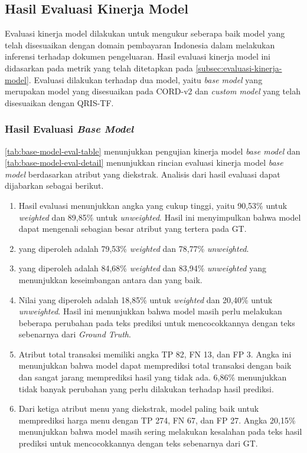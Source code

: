 \subsection{Hasil Evaluasi Kinerja Model}
\label{subsec:hasil-evaluasi-kinerja-model}

Evaluasi kinerja model dilakukan untuk mengukur seberapa baik model \donut{} yang telah disesuaikan dengan domain pembayaran Indonesia dalam melakukan inferensi terhadap dokumen pengeluaran. 
Hasil evaluasi kinerja model ini didasarkan pada metrik yang telah ditetapkan pada \autoref{subsec:evaluasi-kinerja-model}. Evaluasi dilakukan terhadap dua model, yaitu \emph{base model} yang merupakan model \donut{} yang disesuaikan pada \dataset{} CORD-v2 dan \emph{custom model} yang telah disesuaikan dengan \dataset{} QRIS-TF.

\subsubsection{Hasil Evaluasi \emph{Base Model}}
\label{subsubsec:hasil-evaluasi-base-model}
\autoref{tab:base-model-eval-table} menunjukkan pengujian kinerja model \emph{base model} dan \autoref{tab:base-model-eval-detail} menunjukkan rincian evaluasi kinerja model \emph{base model} berdasarkan atribut yang diekstrak. Analisis dari hasil evaluasi dapat dijabarkan sebagai berikut.
\begin{enumerate}
    \item Hasil evaluasi menunjukkan angka \precision{} yang cukup tinggi, yaitu 90,53\% untuk \emph{weighted} dan 89,85\% untuk \emph{unweighted}. Hasil ini menyimpulkan bahwa model dapat mengenali sebagian besar atribut yang tertera pada GT.
    \item \recallfl{} yang diperoleh adalah 79,53\% \emph{weighted} dan 78,77\% \emph{unweighted}. 
    \item \fscore{} yang diperoleh adalah 84,68\% \emph{weighted} dan 83,94\% \emph{unweighted} yang menunjukkan keseimbangan antara \precision{} dan \recall{} yang baik.
    \item Nilai \mcer{} yang diperoleh adalah 18,85\% untuk \emph{weighted} dan 20,40\% untuk \emph{unweighted}. Hasil ini menunjukkan bahwa model masih perlu melakukan beberapa perubahan pada teks prediksi untuk mencocokkannya dengan teks sebenarnya dari \emph{Ground Truth}.
    \item Atribut total transaksi memiliki angka TP 82, FN 13, dan FP 3. Angka ini menunjukkan bahwa model dapat memprediksi total transaksi dengan baik dan sangat jarang memprediksi hasil yang tidak ada. \mcer{} 6,86\% menunjukkan tidak banyak perubahan yang perlu dilakukan terhadap hasil prediksi. 
    \item Dari ketiga atribut menu yang diekstrak, model paling baik untuk memprediksi harga menu dengan TP 274, FN 67, dan FP 27. Angka \mcer{} 20,15\% menunjukkan bahwa model masih sering melakukan kesalahan pada teks hasil prediksi untuk mencocokkannya dengan teks sebenarnya dari GT.
\end{enumerate}


